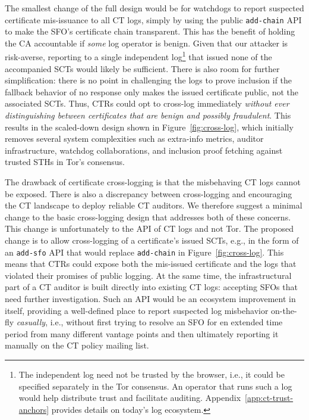 The smallest change of the full design would be for watchdogs to report
suspected certificate mis-issuance to all CT logs, simply by using the public
\texttt{add-chain} API to make the SFO's certificate chain transparent.  This
has the benefit of holding the CA accountable if \emph{some} log operator is
benign.  Given that our attacker is risk-averse, reporting to a single
independent log\footnote{The independent log need not be trusted by the browser,
i.e., it could be specified separately in the Tor consensus.  An operator that
runs such a log would help distribute trust and facilitate auditing.
Appendix~\ref{app:ct-trust-anchors} provides details on today's log ecosystem.}
that issued none of the accompanied SCTs would likely be sufficient.  There is
also room for further simplification: there is no point in challenging the logs
to prove inclusion if the fallback behavior of no response only makes the issued
certificate public, not the associated SCTs. Thus, CTRs could opt to cross-log
immediately \emph{without ever distinguishing between certificates that are
benign and possibly fraudulent}.  This results in the scaled-down design shown
in Figure~\ref{fig:cross-log}, which initially removes several system
complexities such as extra-info metrics, auditor infrastructure, watchdog
collaborations, and inclusion proof fetching against trusted STHs in Tor's
consensus.

The drawback of certificate cross-logging is that the misbehaving CT logs cannot
be exposed.  There is also a discrepancy between cross-logging and encouraging
the CT landscape to deploy reliable CT auditors.  We therefore suggest a
minimal change to the basic cross-logging design that addresses both of these
concerns.  This change is unfortunately to the API of CT logs and not Tor.  The
proposed change is to allow cross-logging of a certificate's issued SCTs, e.g.,
in the form of an \texttt{add-sfo} API that would replace \texttt{add-chain}
in Figure~\ref{fig:cross-log}.
This means that CTRs could expose both the mis-issued certificate and the logs
that violated their promises of public logging.  At the same time, the
infrastructural part of a CT auditor is built directly into existing
CT logs:
	accepting SFOs that need further investigation.
Such an API would be an ecosystem improvement in itself, providing a
well-defined place to report suspected log misbehavior on-the-fly
\emph{casually}, i.e., without first trying to resolve an SFO for en extended
time period from many different vantage points and then ultimately reporting it
manually on the CT policy mailing list.

